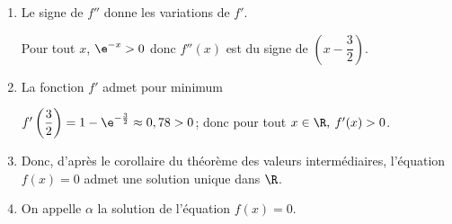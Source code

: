 \begin{enumerate}
\begin{enumerate}
$f'(x)=1\times \e^{-x} + \left (x+\dfrac{1}{2}\right )\times (-1) \e^{-x} + 1
= \left ( -x +\dfrac{1}{2}\right )\e^{-x}+1$, et donc

$f''(x)= -1\times \e^{-x} + \left (-x+\dfrac{1}{2}\right )\times (-1) \e^{-x}
= \left ( x-\dfrac{3}{2}\right )\e^{-x}$. 

		\item %
Le signe de $f''$ donne les variations de $f'$.

Pour tout $x$, $\e^{-x}>0$ donc $f''(x)$ est du 	signe de $\left (x-\dfrac{3}{2}\right )$.


		\item %
La fonction $f'$ admet pour minimum

$f'\left (\dfrac{3}{2}\right ) =1-\e^{-\frac{3}{2}} \approx 0,78>0$; donc   pour tout $x \in \R,\: f'(x) > 0$.
		
		\item %

Donc, d'après le corollaire du théorème des valeurs intermédiaires, l'équation $f(x) = 0$ admet une solution unique dans $\R$.
		
		\item %
On appelle $\alpha$ la solution de l'équation $f(x) = 0$.


\end{enumerate}
\end{enumerate}
